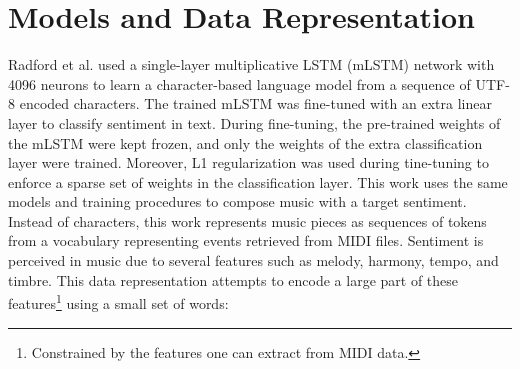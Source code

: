 \section{Models and Data Representation}
\label{sec:model}


Radford et al. \cite{radford_2017} used a single-layer multiplicative LSTM (mLSTM) network \cite{krause2017} with 4096 neurons to learn a character-based language model from a sequence of UTF-8 encoded characters. The trained mLSTM was fine-tuned with an extra linear layer to classify sentiment in text. During fine-tuning, the pre-trained weights of the mLSTM were kept frozen, and only the weights of the extra classification layer were trained. Moreover, L1 regularization was used during tine-tuning to enforce a sparse set of weights in the classification layer. This work uses the same models and training procedures to compose music with a target sentiment. Instead of characters, this work represents music pieces as sequences of tokens from a vocabulary representing events retrieved from MIDI files. Sentiment is perceived in music due to several features such as melody, harmony, tempo, and timbre\cite{kim2010music}. This data representation attempts to encode a large part of these features\footnote{Constrained by the features one can extract from MIDI data.} using a small set of words:





